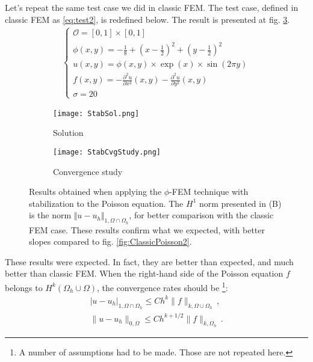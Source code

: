 Let's repeat the same test case we did in classic FEM. The test case, defined in classic FEM as \eqref{eq:test2}, is redefined below. The result is presented at fig. \ref{fig:StabPoisson}.
\begin{align}
    \begin{cases}
    \mathcal{O} = [0,1]\times[0,1] \\
    \phi(x,y) = -\frac{1}{8} + \left( x-\frac{1}{2} \right)^2 + \left( y-\frac{1}{2} \right)^2 \\
    u(x,y)=\phi(x,y) \times \exp(x) \times \sin(2\pi y) \\
    f(x,y) = -\frac{\partial^2 u}{\partial x^2}(x,y) -\frac{\partial^2 u}{\partial y^2}(x,y) \\
    \sigma = 20
    \end{cases}
    \label{eq:test1redef}
\end{align}

\begin{figure}[H]
    \centering
    \begin{subfigure}[b]{0.45\textwidth}
        \texttt{[image: StabSol.png]}
        \caption{Solution}
        \label{fig:StabSol}
    \end{subfigure}
    \begin{subfigure}[b]{0.45\textwidth}
        \texttt{[image: StabCvgStudy.png]}
        \caption{Convergence study}
        \label{fig:StabCvgStudy}
    \end{subfigure}
       \caption{Results obtained when applying the $\phi$-FEM technique with stabilization to the Poisson equation. The $H^1$ norm presented in (B) is the norm $\Vert u - u_h\Vert_{1, \Omega\cap\Omega_h}$, for better comparison with the classic FEM case. These results confirm what we expected, with better slopes compared to fig. \ref{fig:ClassicPoisson2}.}
       \label{fig:StabPoisson}
\end{figure}
These results were expected. In fact, they are better than expected, and much better than classic FEM. When the right-hand side of the Poisson equation $f$ belongs to $H^k(\Omega_h\cup\Omega)$, the convergence rates should be \parencite[p.4]{Reference3}\footnote{A number of assumptions had to be made. Those are not repeated here.}:  
\begin{align}
    | u - u_h|_{1, \Omega\cap\Omega_h} \le Ch^k \|f \|_{k, \Omega\cup\Omega_h}  \,,\\
    \| u - u_h\|_{0, \Omega} \le Ch^{k+1/2} \|f \|_{k, \Omega_h} \,.
\end{align}	


